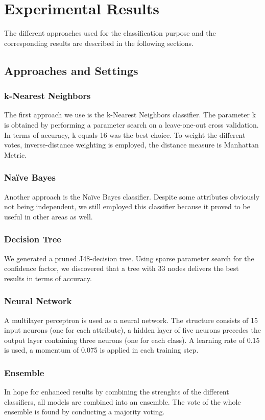 \section{Experimental Results}
The different approaches used for the classification purpose and the corresponding results are described in the following sections. 
\subsection{Approaches and Settings}

\subsubsection*{k-Nearest Neighbors}
The first approach we use is the k-Nearest Neighbors classifier. The parameter k is obtained by performing a parameter search on a leave-one-out cross validation. In terms of accuracy, k equals 16 was the best choice. To weight the different votes, inverse-distance weighting is employed, the distance measure is Manhattan Metric. 

\subsubsection*{Na\"ive Bayes}
Another approach is the Na\"ive Bayes classifier. Despite some attributes obviously not being independent, we still employed this classifier because it proved to be useful in other areas as well.  

\subsubsection*{Decision Tree}
We generated a pruned J48-decision tree. Using sparse parameter search for the confidence factor, we discovered that a tree with 33 nodes delivers the best results in terms of accuracy.

\subsubsection*{Neural Network}
A multilayer perceptron is used as a neural network. The structure consists of 15 input neurons (one for each attribute), a hidden layer of five neurons precedes the output layer containing three neurons (one for each class). A learning rate of 0.15 is used, a momentum of 0.075 is applied in each training step. 

\subsubsection*{Ensemble}
In hope for enhanced results by combining the strenghts of the different classifiers, all models are combined into an ensemble. The vote of the whole ensemble is found by conducting a majority voting. 

